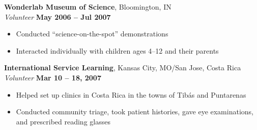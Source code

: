 \documentclass[margin]{res}
\begin{document}
\begin{resume}
{\bf Wonderlab Museum of Science}, Bloomington, IN\\
{\it Volunteer} \hfill {\bf May 2006 -- Jul 2007}
 \begin{itemize} \itemsep -2pt
  \item Conducted ``science-on-the-spot'' demonstrations
  \item Interacted individually with children ages 4--12 and their parents
 \end{itemize}

{\bf International Service Learning}, Kansas City, MO/San Jose, Costa Rica\\
{\it Volunteer} \hfill {\bf Mar 10 -- 18, 2007}
 \begin{itemize} \itemsep -2pt
  \item Helped set up clinics in Costa Rica in the towns of Tib\'{a}s and Puntarenas
  \item Conducted community triage, took patient histories, gave eye examinations, and prescribed reading glasses
 \end{itemize}


\end{resume} 
\end{document}
